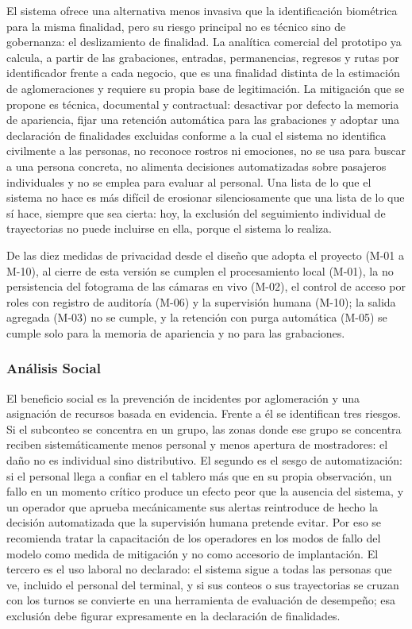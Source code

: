 El sistema ofrece una alternativa menos invasiva que la identificación biométrica para la
misma finalidad, pero su riesgo principal no es técnico sino de gobernanza: el deslizamiento de
finalidad. La analítica comercial del prototipo ya calcula, a partir de las grabaciones, entradas,
permanencias, regresos y rutas por identificador frente a cada negocio, que es una finalidad
distinta de la estimación de aglomeraciones y requiere su propia base de legitimación. La
mitigación que se propone es técnica, documental y contractual: desactivar por defecto la
memoria de apariencia, fijar una retención automática para las grabaciones y adoptar una
declaración de finalidades excluidas conforme a la cual el sistema no identifica civilmente a las
personas, no reconoce rostros ni emociones, no se usa para buscar a una persona concreta, no
alimenta decisiones automatizadas sobre pasajeros individuales y no se emplea para evaluar al
personal. Una lista de lo que el sistema no hace es más difícil de erosionar silenciosamente que
una lista de lo que sí hace, siempre que sea cierta: hoy, la exclusión del seguimiento individual
de trayectorias no puede incluirse en ella, porque el sistema lo realiza.

De las diez medidas de privacidad desde el diseño que adopta el proyecto (M-01 a M-10), al
cierre de esta versión se cumplen el procesamiento local (M-01), la no persistencia del
fotograma de las cámaras en vivo (M-02), el control de acceso por roles con registro de
auditoría (M-06) y la supervisión humana (M-10); la salida agregada (M-03) no se cumple, y la
retención con purga automática (M-05) se cumple solo para la memoria de apariencia y no para
las grabaciones.

\subsubsection{Análisis Social}
\label{subsec:impacto-social}

El beneficio social es la prevención de incidentes por aglomeración y una asignación de
recursos basada en evidencia. Frente a él se identifican tres riesgos. Si el subconteo se
concentra en un grupo, las zonas donde ese grupo se concentra reciben sistemáticamente
menos personal y menos apertura de mostradores: el daño no es individual sino distributivo.
El segundo es el sesgo de automatización: si el personal llega a confiar en el tablero más que en
su propia observación, un fallo en un momento crítico produce un efecto peor que la ausencia
del sistema, y un operador que aprueba mecánicamente sus alertas reintroduce de hecho la
decisión automatizada que la supervisión humana pretende evitar. Por eso se recomienda
tratar la capacitación de los operadores en los modos de fallo del modelo como medida de
mitigación y no como accesorio de implantación. El tercero es el uso laboral no declarado: el
sistema sigue a todas las personas que ve, incluido el personal del terminal, y si sus conteos o
sus trayectorias se cruzan con los turnos se convierte en una herramienta de evaluación de
desempeño; esa exclusión debe figurar expresamente en la declaración de finalidades.

